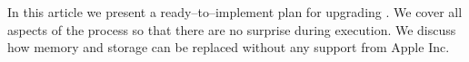 In this article we present a ready--to--implement plan for upgrading \model. We cover all aspects of the process so that there are no surprise during execution. We discuss how memory and storage can be replaced without any support from Apple Inc.

